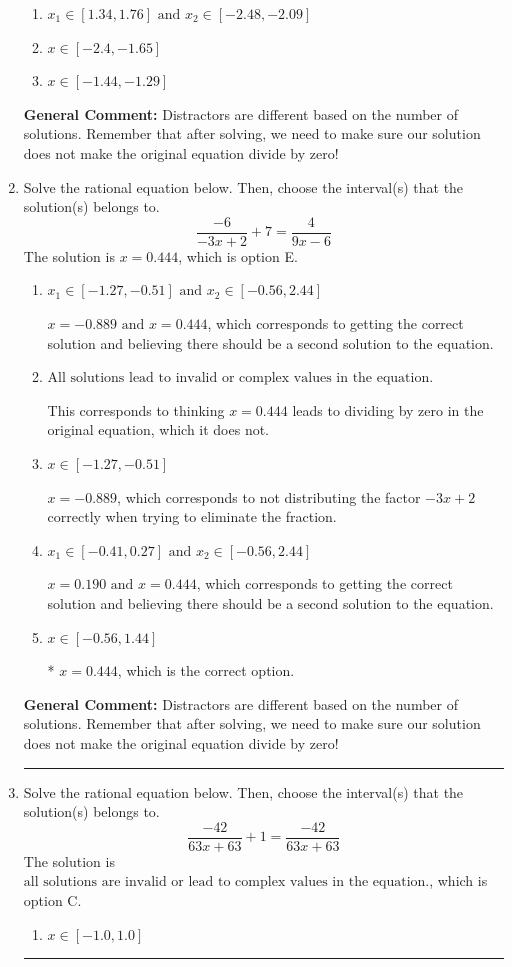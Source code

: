 \documentclass{extbook}[14pt]
\newcommand{\litem}[1]{\item #1

\rule{\textwidth}{0.4pt}}
\begin{document}
\begin{enumerate}
{\begin{enumerate}[label=\Alph*.]
\item \( x_1 \in [1.34, 1.76] \text{ and } x_2 \in [-2.48,-2.09] \)


\item \( x \in [-2.4,-1.65] \)


\item \( x \in [-1.44,-1.29] \)


\end{enumerate}

\textbf{General Comment:} Distractors are different based on the number of solutions. Remember that after solving, we need to make sure our solution does not make the original equation divide by zero!
}
\litem{
Solve the rational equation below. Then, choose the interval(s) that the solution(s) belongs to.
\[ \frac{-6}{-3x + 2} + 7 = \frac{4}{9x -6} \]
The solution is \( x = 0.444 \), which is option E.\begin{enumerate}[label=\Alph*.]
\item \( x_1 \in [-1.27, -0.51] \text{ and } x_2 \in [-0.56,2.44] \)

$x = -0.889 \text{ and } x = 0.444$, which corresponds to getting the correct solution and believing there should be a second solution to the equation.
\item \( \text{All solutions lead to invalid or complex values in the equation.} \)

This corresponds to thinking $x = 0.444$ leads to dividing by zero in the original equation, which it does not.
\item \( x \in [-1.27,-0.51] \)

$x = -0.889$, which corresponds to not distributing the factor $-3x + 2$ correctly when trying to eliminate the fraction.
\item \( x_1 \in [-0.41, 0.27] \text{ and } x_2 \in [-0.56,2.44] \)

$x = 0.190 \text{ and } x = 0.444$, which corresponds to getting the correct solution and believing there should be a second solution to the equation.
\item \( x \in [-0.56,1.44] \)

* $x = 0.444$, which is the correct option.
\end{enumerate}

\textbf{General Comment:} Distractors are different based on the number of solutions. Remember that after solving, we need to make sure our solution does not make the original equation divide by zero!
}
\litem{
Solve the rational equation below. Then, choose the interval(s) that the solution(s) belongs to.
\[ \frac{-42}{63x + 63} + 1 = \frac{-42}{63x + 63} \]
The solution is \( \text{all solutions are invalid or lead to complex values in the equation.} \), which is option C.\begin{enumerate}[label=\Alph*.]
\item \( x \in [-1.0,1.0] \)


\end{enumerate}}
\end{enumerate}
\end{document}
